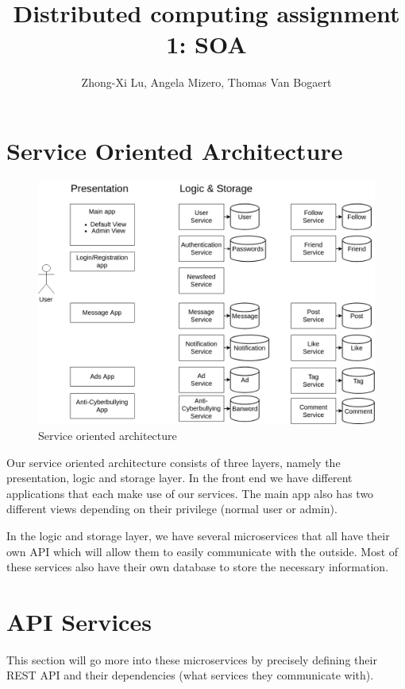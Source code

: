 \documentclass{article}
\title{Distributed computing assignment 1: SOA}
\author{Zhong-Xi Lu, Angela Mizero, Thomas Van Bogaert}
\date{}
\begin{document}
\maketitle

\section{Service Oriented Architecture}

\begin{figure}[H]
    \centering
    \includegraphics[width=\textwidth]{DC.png}
    \caption{Service oriented architecture}
    \label{soa}
\end{figure}

Our service oriented architecture consists of three layers, namely the presentation, logic and storage layer. In the front end we have different applications that each make use of our services. The main app also has two different views depending on their privilege (normal user or admin).

In the logic and storage layer, we have several microservices that all have their own API which will allow them to easily communicate with the outside. Most of these services also have their own database to store the necessary information. 

\section{API Services}

This section will go more into these microservices by precisely defining their REST API and their dependencies (what services they communicate with).
\end{document}
